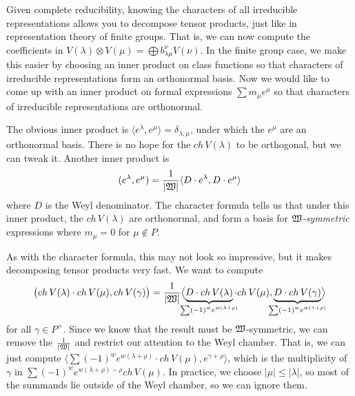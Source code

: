 %
%

 \begin{remark}
 Given complete reducibility, knowing the characters of all irreducible
 representations allows you to decompose tensor products, just like in representation
 theory of finite groups. That is, we can now compute the coefficients in
 $V(\lambda)\otimes V(\mu) = \bigoplus b_{\lambda \mu}^\nu V(\nu)$. In the finite
 group case, we make this easier by choosing an inner product on class functions so
 that characters of irreducible representations form an orthonormal basis. Now we
 would like to come up with an inner product on formal expressions $\sum m_\mu e^\mu$
 so that characters of irreducible representations are orthonormal.

 The obvious inner product is $\langle e^\lambda, e^\mu\rangle =
 \delta_{\lambda,\mu}$, under which the $e^\mu$ are an orthonormal basis. There is no
 hope for the $ch\, V(\lambda)$ to be orthogonal, but we can tweak it. Another inner
 product is
 \[
    (e^\lambda,e^\mu) = \frac{1}{|\mathfrak{W}|} \langle D\cdot e^\lambda, D\cdot
    e^\mu\rangle
 \]
 where $D$ is the Weyl denominator. The character formula tells us that under this
 inner product, the $ch\, V(\lambda)$ are orthonormal, and form a basis for
 \emph{$\mathfrak{W}$-symmetric} expressions where $m_\mu=0$ for $\mu\not\in P$.

 As with the character formula, this may not look so impressive, but it makes
 decomposing tensor products very fast. We want to compute
 \[
   \bigl(ch\, V(\lambda) \cdot ch\, V(\mu),ch\, V(\gamma)\bigr) =
   \frac{1}{|\weyl|}\bigl\langle
   \underbrace{D\cdot ch\, V(\lambda)}_{
   \makebox[0pt]{\scriptsize $\sum (-1)^w e^{w(\lambda+\rho)}$}}
   \cdot ch\, V(\mu),
   \underbrace{D\cdot ch\,V(\gamma)}_{
   \makebox[0pt]{\scriptsize $\sum (-1)^w e^{w(\gamma+\rho)}$}}
   \bigr\rangle
 \]
 for all $\gamma\in P^+$. Since we know that the result must be $\mathfrak{W}$-symmetric, we
 can remove the $\frac{1}{|\mathfrak{W}|}$ and restrict our attention to the Weyl chamber.
 That is, we can just compute $\bigl\langle \sum (-1)^w e^{w(\lambda+\rho)}\cdot ch\,
 V(\mu),e^{\gamma+\rho}\bigr\rangle$, which is the multiplicity of $\gamma$ in
 $\sum (-1)^w e^{w(\lambda+\rho)-\rho}ch\, V(\mu)$. In practice, we choose $|\mu|\le
 |\lambda|$, so most of the summands lie outside of the Weyl chamber, so
 we can ignore them.
 \end{remark}

